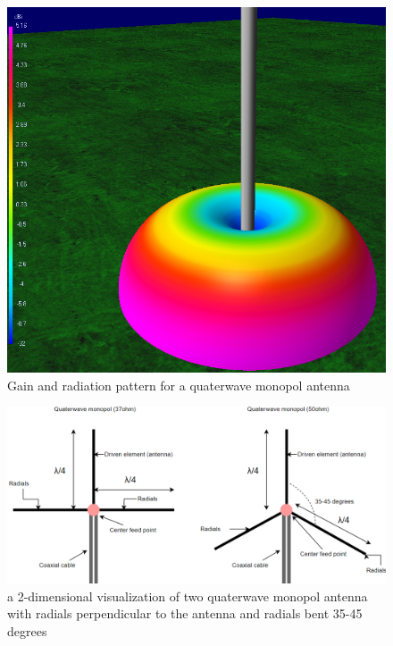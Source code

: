 \begin{figure}[h]
\centering
\includegraphics[scale=0.50]{figures/quaterwaveMonoplAntenna.PNG}
\caption{Gain and radiation pattern for a quaterwave monopol antenna}
\end{figure}

\begin{figure}[h]
\hspace{-1cm}
\includegraphics[scale=0.55]{figures/QuaterWaveMonopolAntennaRadials.PNG}
\caption{a 2-dimensional visualization of two quaterwave monopol antenna with radials perpendicular to the antenna and radials bent 35-45 degrees}
\end{figure}

\newpage

